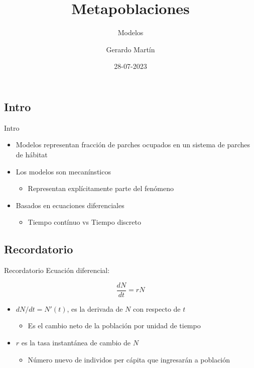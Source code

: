 \documentclass[
  11pt,
  ignorenonframetext,
]{beamer}
\title{Metapoblaciones}
\subtitle{Modelos}
\author{Gerardo Martín}
\date{28-07-2023}
\providecommand{\tightlist}{%
  \setlength{\itemsep}{0pt}\setlength{\parskip}{0pt}}
\begin{document}
\frame{\titlepage}

\hypertarget{intro}{%
\subsection{Intro}\label{intro}}

\begin{frame}{Intro}
\begin{itemize}
\item
  Modelos representan fracción de parches ocupados en un sistema de
  parches de hábitat
\item
  Los modelos son mecanínsticos

  \begin{itemize}
  \tightlist
  \item
    Representan explícitamente parte del fenómeno
  \end{itemize}
\item
  Basados en ecuaciones diferenciales

  \begin{itemize}
  \tightlist
  \item
    Tiempo contínuo vs Tiempo discreto
  \end{itemize}
\end{itemize}
\end{frame}

\hypertarget{recordatorio}{%
\subsection{Recordatorio}\label{recordatorio}}

\begin{frame}{Recordatorio}
Ecuación diferencial:

\[\frac{dN}{dt} = r N\]

\begin{itemize}
\item
  \(dN/dt = N'(t)\), es la derivada de \(N\) con respecto de \(t\)

  \begin{itemize}
  \tightlist
  \item
    Es el cambio neto de la población por unidad de tiempo
  \end{itemize}
\item
  \(r\) es la tasa instantánea de cambio de \(N\)

  \begin{itemize}
  \tightlist
  \item
    Número nuevo de individos per cápita que ingresarán a población
  \end{itemize}
\end{itemize}
\end{frame}
\end{document}
